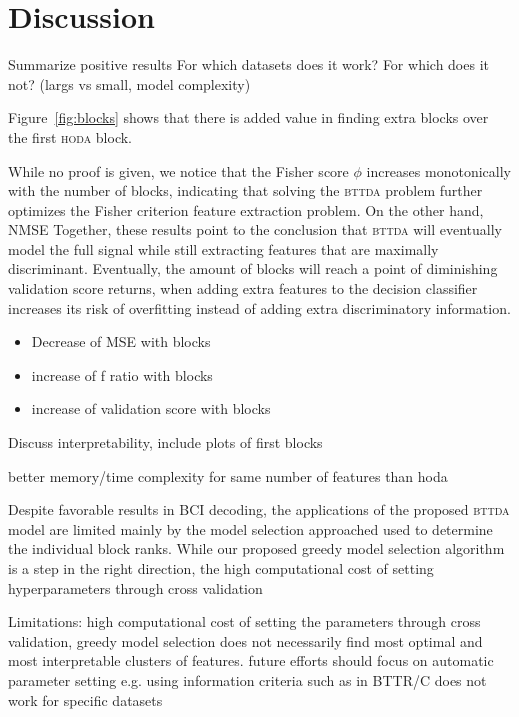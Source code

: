 \documentclass[twocolumn]{article}
\begin{document}
\section{Discussion}
Summarize positive results
For which datasets does it work? For which does it not? (largs vs small, model
complexity)

Figure~\ref{fig:blocks} shows that there is added value in finding extra blocks
over the first \textsc{hoda} block.
\begin{figure*}
  
  \caption{figure blocks}
  \label{fig:blocks}
\end{figure*}
While no proof is given, we notice that the Fisher score $\phi$ increases
monotonically with the number of blocks, indicating that solving the
\textsc{bttda} problem further optimizes the Fisher criterion feature
extraction problem.
On the other hand, NMSE 
Together, these results point to the conclusion that \textsc{bttda} will
eventually model the full signal while still extracting features that are
maximally discriminant.
Eventually, the amount of blocks will reach a point of diminishing validation
score returns, when adding extra features to the decision classifier increases
its risk of overfitting instead of adding extra discriminatory information.
\begin{itemize}
  \item Decrease of MSE with blocks
  \item increase of f ratio with blocks
  \item increase of validation score with blocks
\end{itemize}

Discuss interpretability, include plots of first blocks

better memory/time complexity for same number of features than hoda

Despite favorable results in BCI decoding, the applications of the proposed
\textsc{bttda} model are limited mainly by the model selection approached used
to determine the individual block ranks.
While our proposed greedy model selection algorithm is a step in the right
direction, the high computational cost of setting hyperparameters through cross
validation

Limitations: high computational cost of setting the parameters through cross
validation, greedy model
selection does not necessarily find most optimal and most interpretable
clusters of features. future efforts
should focus on automatic parameter setting e.g. using information criteria
such as in BTTR/C
does not work for specific datasets
\end{document}
